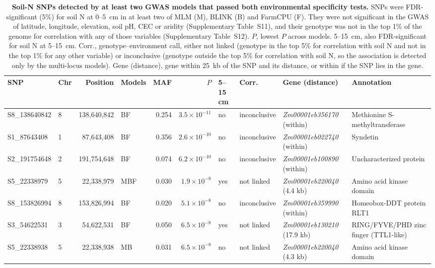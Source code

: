 \begin{table}[ht]
  \centering
  \scriptsize
  \caption{\textbf{Soil-N SNPs detected by at least two GWAS models that passed both environmental specificity tests.} SNPs were FDR-significant (5\%) for soil N at 0--5~cm in at least two of MLM (M), BLINK (B) and FarmCPU (F). They were not significant in the GWAS of latitude, longitude, elevation, soil pH, CEC or aridity (Supplementary Table~S11), and their genotype was not in the top 1\% of the genome for correlation with any of those variables (Supplementary Table~S12). $P$, lowest $P$ across models. 5--15~cm, also FDR-significant for soil N at 5--15~cm. Corr., genotype--environment call, either not linked (genotype in the top 5\% for correlation with soil N and not in the top 1\% for any other variable) or inconclusive (genotype outside the top 5\% for correlation with soil N, so the association is detected only by the multi-locus models). Gene (distance), gene within 25~kb of the SNP and its distance, or within if the SNP lies in the gene.}
  \label{tab:soilN_specific}
  \begin{tabular}{llrlrrllll}
  \hline
  SNP & Chr & Position & Models & MAF & $P$ & 5--15 cm & Corr. & Gene (distance) & Annotation \\
  \hline
  S8\_138640842 & 8 & 138,640,842 & BF  & 0.254 & $3.5\times10^{-11}$ & no  & inconclusive & \textit{Zm00001eb356170} (within) & Methionine S-methyltransferase \\
  S1\_87643408  & 1 &  87,643,408 & BF  & 0.356 & $2.6\times10^{-10}$ & no  & inconclusive & \textit{Zm00001eb022740} (within) & Syndetin \\
  S2\_191754648 & 2 & 191,754,648 & BF  & 0.074 & $6.2\times10^{-10}$ & no  & inconclusive & \textit{Zm00001eb100890} (within) & Uncharacterized protein \\
  S5\_22338979  & 5 &  22,338,979 & MBF & 0.030 & $1.9\times10^{-8}$  & yes & not linked   & \textit{Zm00001eb220040} (4.4 kb) & Amino acid kinase domain \\
  S8\_153826994 & 8 & 153,826,994 & BF  & 0.020 & $5.1\times10^{-8}$  & no  & inconclusive & \textit{Zm00001eb359990} (within) & Homeobox-DDT protein RLT1 \\
  S3\_54622531  & 3 &  54,622,531 & BF  & 0.050 & $6.5\times10^{-8}$  & yes & not linked   & \textit{Zm00001eb130210} (17.9 kb) & RING/FYVE/PHD zinc finger (TTL1-like) \\
  S5\_22338938  & 5 &  22,338,938 & MB  & 0.031 & $6.5\times10^{-8}$  & no  & not linked   & \textit{Zm00001eb220040} (4.3 kb) & Amino acid kinase domain \\

\end{tabular}
\end{table}
